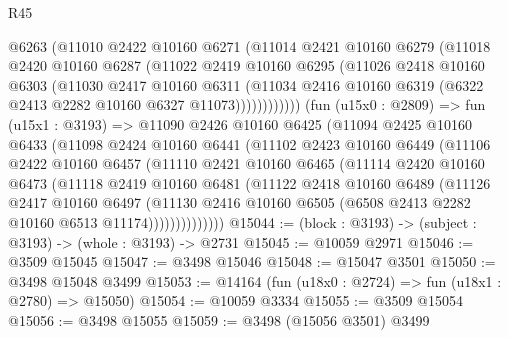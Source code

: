 \begin{lexlean}{R45}
\begin{coremodule}
                @6263
                (@11010
                  @2422
                  @10160
                  @6271
                  (@11014
                    @2421
                    @10160
                    @6279
                    (@11018
                      @2420
                      @10160
                      @6287
                      (@11022
                        @2419
                        @10160
                        @6295
                        (@11026
                          @2418
                          @10160
                          @6303
                          (@11030
                            @2417
                            @10160
                            @6311
                            (@11034
                              @2416
                              @10160
                              @6319
                              (@6322 @2413 @2282 @10160 @6327 @11073))))))))))))
        (fun (u15x0 : @2809) =>
        fun (u15x1 : @3193) =>
        @11090
          @2426
          @10160
          @6425
          (@11094
            @2425
            @10160
            @6433
            (@11098
              @2424
              @10160
              @6441
              (@11102
                @2423
                @10160
                @6449
                (@11106
                  @2422
                  @10160
                  @6457
                  (@11110
                    @2421
                    @10160
                    @6465
                    (@11114
                      @2420
                      @10160
                      @6473
                      (@11118
                        @2419
                        @10160
                        @6481
                        (@11122
                          @2418
                          @10160
                          @6489
                          (@11126
                            @2417
                            @10160
                            @6497
                            (@11130
                              @2416
                              @10160
                              @6505
                              (@6508 @2413 @2282 @10160 @6513 @11174))))))))))))))
@15044 := (block : @3193) -> (subject : @3193) -> (whole : @3193) -> @2731
@15045 := @10059 @2971
@15046 := @3509 @15045
@15047 := @3498 @15046
@15048 := @15047 @3501
@15050 := @3498 @15048 @3499
@15053 := @14164 (fun (u18x0 : @2724) => fun (u18x1 : @2780) => @15050)
@15054 := @10059 @3334
@15055 := @3509 @15054
@15056 := @3498 @15055
@15059 := @3498 (@15056 @3501) @3499

\end{coremodule}
\end{lexlean}
